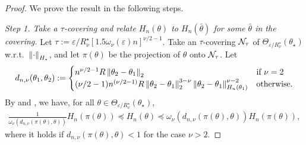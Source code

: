 \begin{proof}
    We prove the result in the following steps.

    \emph{Step 1. Take a $\tau$-covering and relate $H_n(\theta)$ to $H_n(\bar \theta)$ for some $\bar \theta$ in the covering.}
    Let $\tau := \varepsilon / R_\nu^\star [1.5 \omega_\nu(\varepsilon) n]^{\nu/2-1}$. Take an $\tau$-covering $\mathcal{N}_\tau$ of $\Theta_{\varepsilon/R_\nu^\star}(\theta_\star)$ w.r.t.~$\left\lVert \cdot \right\rVert_{H_\star}$, and let $\pi(\theta)$ be the projection of $\theta$ onto $\mathcal{N}_\tau$.
    Let
    \begin{align*}
        d_{n, \nu}(\theta_1, \theta_2) :=
        \begin{cases}
            n^{\nu/2-1} R \left\lVert \theta_2 - \theta_1 \right\rVert_2 & \mbox{if } \nu = 2 \\
            (\nu/2-1) n^{(\nu/2-1)} R \left\lVert \theta_2 - \theta_1 \right\rVert_2^{3 - \nu} \left\lVert \theta_2 - \theta_1 \right\rVert_{H_n(\theta_1)}^{\nu-2} & \mbox{otherwise}.
        \end{cases}
    \end{align*}
    By  and , we have, for all $\theta \in \Theta_{\varepsilon/R_\nu^\star}(\theta_\star)$,
    \begin{align}\label{eq:emp_hess_sandwich}
        \frac1{\omega_\nu(d_{n,\nu}(\pi(\theta), \theta))} H_n(\pi(\theta)) \preceq H_n(\theta) \preceq \omega_\nu(d_{n,\nu}(\pi(\theta), \theta)) H_n(\pi(\theta)),
    \end{align}
    where it holds if $d_{n,\nu}(\pi(\theta), \theta) < 1$ for the case $\nu > 2$.
    

\end{proof}
